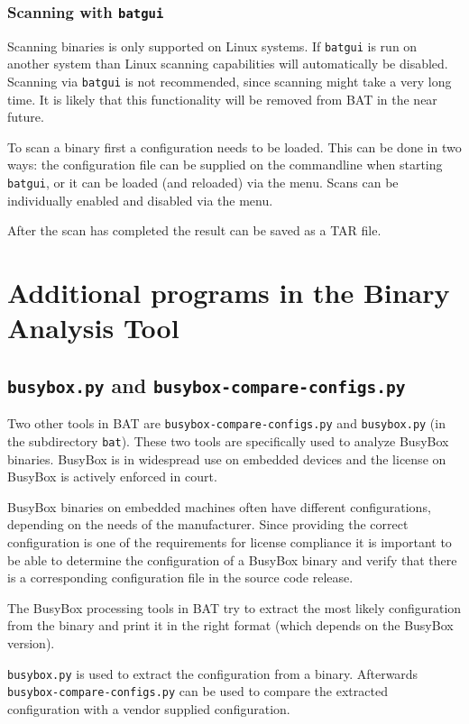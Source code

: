 \documentclass[10pt]{article}
\begin{document}
\subsubsection{Scanning with \texttt{batgui}}

Scanning binaries is only supported on Linux systems. If \texttt{batgui} is run
on another system than Linux scanning capabilities will automatically be
disabled. Scanning via \texttt{batgui} is not recommended, since scanning might
take a very long time. It is likely that this functionality will be removed
from BAT in the near future.

To scan a binary first a configuration needs to be loaded. This can be done in
two ways: the configuration file can be supplied on the commandline when
starting \texttt{batgui}, or it can be loaded (and reloaded) via the menu.
Scans can be individually enabled and disabled via the menu.

After the scan has completed the result can be saved as a TAR file.

\section{Additional programs in the Binary Analysis Tool}

\subsection{\texttt{busybox.py} and \texttt{busybox-compare-configs.py}}

Two other tools in BAT are \texttt{busybox-compare-configs.py} and
\texttt{busybox.py} (in the subdirectory \texttt{bat}). These two tools are
specifically used to analyze BusyBox binaries. BusyBox is in widespread use on
embedded devices and the license on BusyBox is actively enforced in court.

BusyBox binaries on embedded machines often have different configurations,
depending on the needs of the manufacturer. Since providing the correct
configuration is one of the requirements for license compliance it is important
to be able to determine the configuration of a BusyBox binary and verify that
there is a corresponding configuration file in the source code release.

The BusyBox processing tools in BAT try to extract the most likely
configuration from the binary and print it in the right format (which
depends on the BusyBox version).

\texttt{busybox.py} is used to extract the configuration from a binary.
Afterwards \texttt{busybox-compare-configs.py} can be used to compare the
extracted configuration with a vendor supplied configuration.
\end{document}

